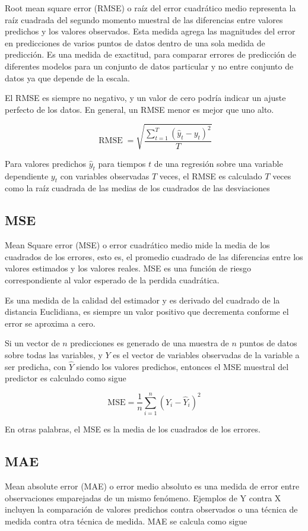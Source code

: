 Root mean square error (RMSE) o raíz del error cuadrático medio representa la raíz cuadrada del segundo momento muestral de las diferencias entre valores predichos y los valores observados. Esta medida agrega las magnitudes del error en predicciones de varios puntos de datos dentro de una sola medida de predicción.
Es una medida de exactitud, para comparar errores de predicción de diferentes modelos para un conjunto de datos particular y no entre conjunto de datos ya que depende de la escala.

El RMSE es siempre no negativo, y un valor de cero podría indicar un ajuste perfecto de los datos. En general, un RMSE menor es mejor que uno alto.

\[
\operatorname{RMSE}=\sqrt{\frac{\sum_{t=1}^{T}\left(\hat{y}_{t}-y_{t}\right)^{2}}{T}}
\] 

Para valores predichos $\hat{y}_t$ para tiempos $t$ de una regresión sobre una variable dependiente $y_t$ con variables observadas $T$ veces, el RMSE es calculado $T$ veces como la raíz cuadrada de las medias de los cuadrados de las desviaciones

\subsection{MSE}

Mean Square error (MSE) o error cuadrático medio mide la media de los cuadrados de los errores, esto es, el promedio cuadrado de las diferencias entre los valores estimados y los valores reales. MSE es una función de riesgo correspondiente al valor esperado de la perdida cuadrática.

Es una medida de la calidad del estimador y es derivado del cuadrado de la distancia Euclidiana, es siempre un valor positivo que decrementa conforme el error se aproxima a cero.

Si un vector de $n$ predicciones es generado de una muestra de $n$ puntos de datos sobre todas las variables, y $Y$ es el vector de variables observadas de la variable a ser predicha, con $\hat{Y}$ siendo los valores predichos, entonces el MSE muestral del predictor es calculado como sigue 

\[
\mathrm{MSE}=\frac{1}{n} \sum_{i=1}^{n}\left(Y_{i}-\hat{Y}_{i}\right)^{2}
\]

En otras palabras, el MSE es la media de los cuadrados de los errores. 

\subsection{MAE}
Mean absolute error (MAE) o error medio absoluto es una medida de error entre observaciones emparejadas de un mismo fenómeno. Ejemplos de Y contra X incluyen la comparación de valores predichos contra observados o una técnica de medida contra otra técnica de medida. MAE se calcula como sigue

